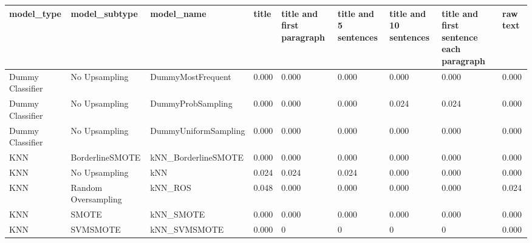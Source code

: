\begin{tabular}{lllllllll}
\toprule
                  model\_type &       model\_subtype &                                   model\_name & title & title and first paragraph & title and 5 sentences & title and 10 sentences & title and first sentence each paragraph &  raw text \\
\midrule
            Dummy Classifier &       No Upsampling &                            DummyMostFrequent & 0.000 &                     0.000 &                 0.000 &                  0.000 &                                   0.000 &     0.000 \\
            Dummy Classifier &       No Upsampling &                            DummyProbSampling & 0.000 &                     0.000 &                 0.000 &                  0.024 &                                   0.024 &     0.000 \\
            Dummy Classifier &       No Upsampling &                         DummyUniformSampling & 0.000 &                     0.000 &                 0.000 &                  0.000 &                                   0.000 &     0.000 \\
                         KNN &     BorderlineSMOTE &                          kNN\_BorderlineSMOTE & 0.000 &                     0.000 &                 0.000 &                  0.000 &                                   0.000 &     0.000 \\
                         KNN &       No Upsampling &                                          kNN & 0.024 &                     0.024 &                 0.024 &                  0.000 &                                   0.000 &     0.000 \\
                         KNN & Random Oversampling &                                      kNN\_ROS & 0.048 &                     0.000 &                 0.000 &                  0.000 &                                   0.000 &     0.024 \\
                         KNN &               SMOTE &                                    kNN\_SMOTE & 0.000 &                     0.000 &                 0.000 &                  0.000 &                                   0.000 &     0.000 \\
                         KNN &            SVMSMOTE &                                 kNN\_SVMSMOTE & 0.000 &                         0 &                     0 &                      0 &                                       0 &     0.000 \\

\end{tabular}
